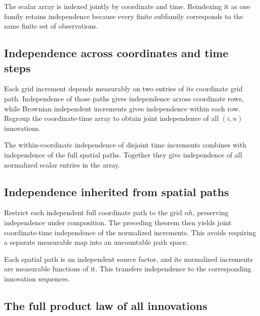 \documentclass[11pt,a4paper]{report}
\begin{document}
The scalar array is indexed jointly by coordinate and time. Reindexing it as one family retains independence because every finite subfamily corresponds to the same finite set of observations.

\subsection{\texorpdfstring{Independence across coordinates and time steps}{Independence across coordinates and time steps}}
\label{report-step-UnadjustedLangevin-BrownianInnovations-lean-7}


Each grid increment depends measurably on two entries of its coordinate grid path. Independence of those paths gives independence across coordinate rows, while Brownian independent increments gives independence within each row. Regroup the coordinate-time array to obtain joint independence of all \((i,n)\) innovations.



The within-coordinate independence of disjoint time increments combines with independence of the full spatial paths. Together they give independence of all normalized scalar entries in the array.

\subsection{\texorpdfstring{Independence inherited from spatial paths}{Independence inherited from spatial paths}}
\label{report-step-UnadjustedLangevin-BrownianInnovations-lean-8}


Restrict each independent full coordinate path to the grid \(nh\), preserving independence under composition. The preceding theorem then yields joint coordinate-time independence of the normalized increments. This avoids requiring a separate measurable map into an uncountable path space.



Each spatial path is an independent source factor, and its normalized increments are measurable functions of it. This transfers independence to the corresponding innovation sequences.

\subsection{\texorpdfstring{The full product law of all innovations}{The full product law of all innovations}}
\label{report-step-UnadjustedLangevin-BrownianInnovations-lean-9}
\end{document}
